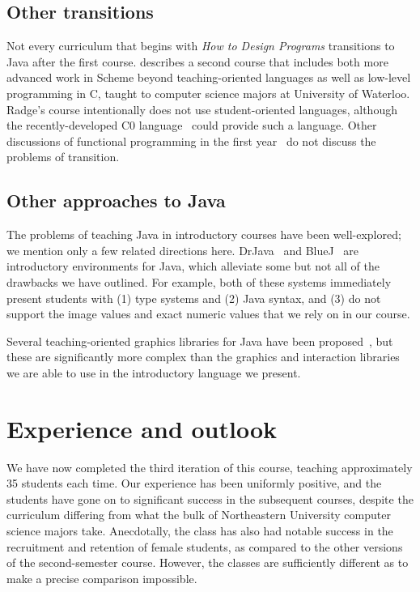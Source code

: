 \documentclass[submission,copyright]{eptcs}
\def\htdp{\emph{How to Design Programs}\xspace}
\begin{document}
\subsection{Other transitions}

Not every curriculum that begins with \htdp transitions to Java after
the first course.  \citet{dvanhorn:Ragde2008Chilling} describes a
second course that includes both more advanced work in Scheme beyond
teaching-oriented languages as well as low-level programming in C,
taught to computer science majors at University of Waterloo.  Radge's
course intentionally does not use student-oriented languages, although
the recently-developed C0 language~\cite{local:c0} could provide such
a language. Other discussions of functional programming in the first
year~\cite{dvanhorn:Chakravarty2004Risks} do not discuss the problems
of transition.

\subsection{Other approaches to Java}

The problems of teaching Java in introductory courses have been
well-explored; we mention only a few related directions here.
DrJava~\cite{dvanhorn:Allen2002DrJava} and
BlueJ~\cite{dvanhorn:Hsia2005Taming,dvanhorn:Kolling2003} are
introductory environments for Java, which alleviate some but not all
of the drawbacks we have outlined.
%
For example, both of these systems immediately present students with
(1) type systems and (2) Java syntax, and (3) do not support the image
values and exact numeric values that we rely on in our course.


Several teaching-oriented graphics libraries for Java have been
proposed~\cite{dvanhorn:Bruce2001Library,dvanhorn:Alphonce2003Using},
but these are significantly more complex than the graphics and
interaction libraries we are able to use in the introductory language
we present.


\section{Experience and outlook}
\label{sec:conclusion}

We have now completed the third iteration of this course, teaching
approximately 35 students each time.  Our experience has been
uniformly positive, and the students have gone on to significant
success in the subsequent courses, despite the curriculum differing
from what the bulk of Northeastern University computer science majors
take.  Anecdotally, the class has also had notable success in the
recruitment and retention of female students, as compared to the other
versions of the second-semester course. However, the classes are
sufficiently different as to make a precise comparison impossible.
\end{document}

